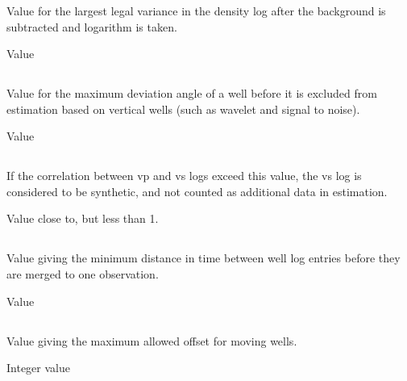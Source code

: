 \subsubsection{}
 \slist
   \item \Description Value for the largest legal variance in the density log after the background is subtracted and logarithm is taken.
   \item \Argument Value
   \item {}
 \elist

\subsection{}
 \slist
   \item \Description Value for the maximum deviation angle of a well before it is excluded from estimation based on vertical wells (such as wavelet and signal to noise).
   \item \Argument Value
   \item {}
 \elist

\subsection{}
 \slist
   \item \Description If the correlation between vp and vs logs exceed this value, the vs log is considered to be synthetic, and not counted as additional data in estimation.
   \item \Argument Value close to, but less than 1.
   \item {}
 \elist

\subsection{}
 \slist
   \item \Description Value giving the minimum distance in time between well log entries before they are merged to one observation.
   \item \Argument Value
   \item {}
 \elist

\subsection{}
 \slist
   \item \Description Value giving the maximum allowed offset for moving wells.
   \item \Argument Integer value
   \item {}
 \elist

